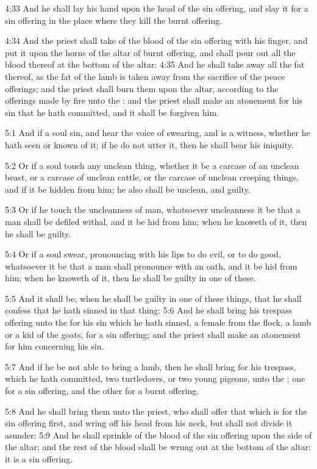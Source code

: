 4:33 And he shall lay his hand upon the head of the sin offering, and
slay it for a sin offering in the place where they kill the burnt
offering.

4:34 And the priest shall take of the blood of the sin offering with
his finger, and put it upon the horns of the altar of burnt offering,
and shall pour out all the blood thereof at the bottom of the altar:
4:35 And he shall take away all the fat thereof, as the fat of the
lamb is taken away from the sacrifice of the peace offerings; and the
priest shall burn them upon the altar, according to the offerings made
by fire unto the \LORD: and the priest shall make an atonement for his
sin that he hath committed, and it shall be forgiven him.

5:1 And if a soul sin, and hear the voice of swearing, and is a
witness, whether he hath seen or known of it; if he do not utter it,
then he shall bear his iniquity.

5:2 Or if a soul touch any unclean thing, whether it be a carcase of
an unclean beast, or a carcase of unclean cattle, or the carcase of
unclean creeping things, and if it be hidden from him; he also shall
be unclean, and guilty.

5:3 Or if he touch the uncleanness of man, whatsoever uncleanness it
be that a man shall be defiled withal, and it be hid from him; when he
knoweth of it, then he shall be guilty.

5:4 Or if a soul swear, pronouncing with his lips to do evil, or to do
good, whatsoever it be that a man shall pronounce with an oath, and it
be hid from him; when he knoweth of it, then he shall be guilty in one
of these.

5:5 And it shall be, when he shall be guilty in one of these things,
that he shall confess that he hath sinned in that thing: 5:6 And he
shall bring his trespass offering unto the \LORD for his sin which he
hath sinned, a female from the flock, a lamb or a kid of the goats,
for a sin offering; and the priest shall make an atonement for him
concerning his sin.

5:7 And if he be not able to bring a lamb, then he shall bring for his
trespass, which he hath committed, two turtledoves, or two young
pigeons, unto the \LORD; one for a sin offering, and the other for a
burnt offering.

5:8 And he shall bring them unto the priest, who shall offer that
which is for the sin offering first, and wring off his head from his
neck, but shall not divide it asunder: 5:9 And he shall sprinkle of
the blood of the sin offering upon the side of the altar; and the rest
of the blood shall be wrung out at the bottom of the altar: it is a
sin offering.

